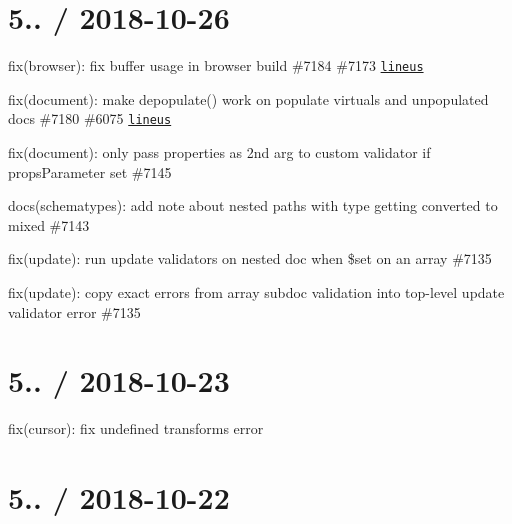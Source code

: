 \section*{5.. / 2018-\/10-\/26 }


\begin{DoxyItemize}
\item fix(browser)\+: fix buffer usage in browser build \#7184 \#7173 \href{https://github.com/lineus}{\tt lineus}
\item fix(document)\+: make depopulate() work on populate virtuals and unpopulated docs \#7180 \#6075 \href{https://github.com/lineus}{\tt lineus}
\item fix(document)\+: only pass properties as 2nd arg to custom validator if {\ttfamily props\+Parameter} set \#7145
\item docs(schematypes)\+: add note about nested paths with {\ttfamily type} getting converted to mixed \#7143
\item fix(update)\+: run update validators on nested doc when \$set on an array \#7135
\item fix(update)\+: copy exact errors from array subdoc validation into top-\/level update validator error \#7135
\end{DoxyItemize}

\section*{5.. / 2018-\/10-\/23 }


\begin{DoxyItemize}
\item fix(cursor)\+: fix undefined transforms error
\end{DoxyItemize}

\section*{5.. / 2018-\/10-\/22 }



